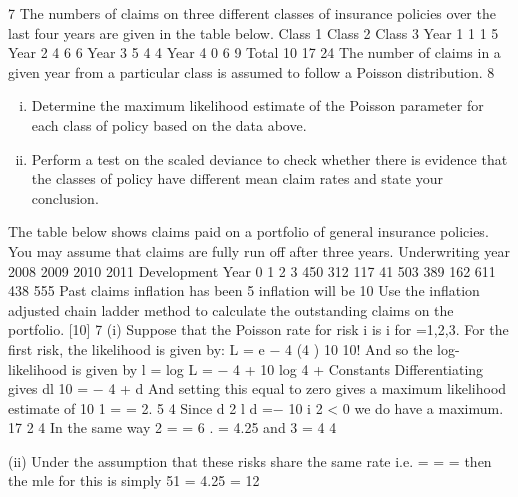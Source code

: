 \documentclass[a4paper,12pt]{article}
\begin{document}
\begin{enumerate}
7
The numbers of claims on three different classes of insurance policies over the last
four years are given in the table below.
Class 1
Class 2
Class 3
Year 1
1
1
5
Year 2
4
6
6
Year 3
5
4
4
Year 4
0
6
9
Total
10
17
24
The number of claims in a given year from a particular class is assumed to follow a
Poisson distribution.
8

\begin{enumerate}[(i)]
\item Determine the maximum likelihood estimate of the Poisson parameter for each class of policy based on the data above.
\item Perform a test on the scaled deviance to check whether there is evidence that the classes of policy have different mean claim rates and state your
conclusion.
\end{enumerate}


The table below shows claims paid on a portfolio of general insurance policies. You
may assume that claims are fully run off after three years.
Underwriting year
2008
2009
2010
2011
Development Year
0
1
2
3
450 312 117 41
503 389 162
611 438
555
Past claims inflation has been 5%
inflation will be 10%
Use the inflation adjusted chain ladder method to calculate the outstanding claims on
the portfolio.
[10]
7
(i)
Suppose that the Poisson rate for risk i is \lambda i for =1,2,3.
For the first risk, the likelihood is given by:
L = e − 4 
(4  ) 10
10!
And so the log-likelihood is given by
l = log L = − 4  + 10 log 4  + Constants
Differentiating gives
dl
10
= − 4 +
d 
And setting this equal to zero gives a maximum likelihood estimate of
10
\hat{\lambda} 1 =
= 2. 5
4
Since
d 2 l
d 
=−
10
\lambda i 2
< 0 we do have a maximum.
17
2 4
In the same way \hat{\lambda} 2 =
= 6 .
= 4.25 and \hat{\lambda} 3 =
4
4

(ii)
Under the assumption that these risks share the same rate i.e.  =  =  = \lambda
then the mle for this is simply
51
= 4.25
\hat{\lambda} =
12


\end{enumerate}
\end{document}
